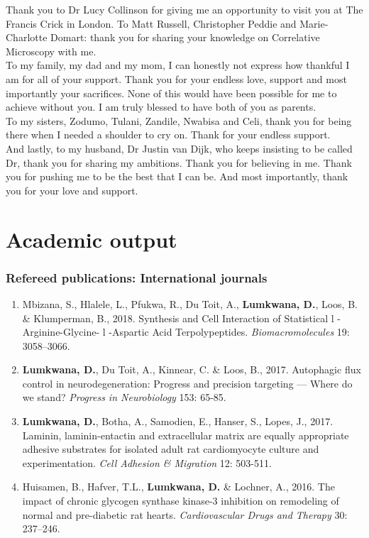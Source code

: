 \noindent
Thank you to Dr Lucy Collinson for giving me an opportunity to visit you at The Francis Crick in London. To Matt Russell, Christopher Peddie and Marie-Charlotte Domart: thank you for sharing your knowledge on Correlative Microscopy with me. \\

\noindent
To my family, my dad and my mom, I can honestly not express how thankful I am for all of your support. Thank you for your endless love, support and most importantly your sacrifices. None of this would have been possible for me to achieve without you. I am truly blessed to have both of you as parents.\\

\noindent
To my sisters, Zodumo, Tulani, Zandile, Nwabisa and Celi, thank you for being there when I needed a shoulder to cry on. Thank for your endless support.\\

\noindent
And lastly, to my husband, Dr Justin van Dijk, who keeps insisting to be called Dr, thank you for sharing my ambitions. Thank you for believing in me. Thank you for pushing me to be the best that I can be. And most importantly, thank you for your love and support.\\

\chapter{Academic output}

\subsection*{Refereed publications: International journals}
\begin{enumerate}
\item Mbizana, S., Hlalele, L., Pfukwa, R., Du Toit, A., \textbf{Lumkwana, D.}, Loos, B. \& Klumperman, B., 2018. Synthesis and Cell Interaction of Statistical l -Arginine-Glycine- l -Aspartic Acid Terpolypeptides. \textit{Biomacromolecules} 19: 3058–3066.
\item \textbf{Lumkwana, D.}, Du Toit, A., Kinnear, C. \& Loos, B., 2017. Autophagic flux control in neurodegeneration: Progress and precision targeting — Where do we stand? \textit{Progress in Neurobiology} 153: 65-85.
\item \textbf{Lumkwana, D.}, Botha, A., Samodien, E., Hanser, S., Lopes, J., 2017. Laminin, laminin-entactin and extracellular matrix are equally appropriate adhesive substrates for isolated adult rat cardiomyocyte culture and experimentation. \textit{Cell Adhesion \& Migration} 12: 503-511.
\item Huisamen, B., Hafver, T.L., \textbf{Lumkwana, D.} \& Lochner, A., 2016. The impact of chronic glycogen synthase kinase-3 inhibition on remodeling of normal and pre-diabetic rat hearts. \textit{Cardiovascular Drugs and Therapy} 30: 237–246.
\end{enumerate}

